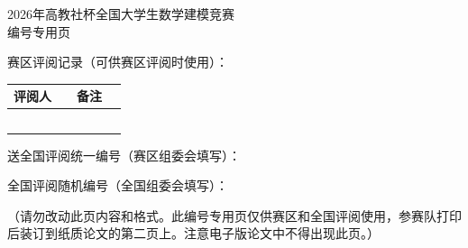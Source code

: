 \thispagestyle{empty}
\begin{center}
  {\heiti 2026年高教社杯全国大学生数学建模竞赛}\\[6pt]
  {\heiti 编\quad 号\quad 专\quad 用\quad 页}
\end{center}

\vspace{2em}
{\heiti 赛区评阅记录（可供赛区评阅时使用）：}

\vspace{1em}
\renewcommand{\arraystretch}{1.8}
\begin{center}
\begin{tabular}{|p{2.2cm}|p{4.5cm}|p{2.2cm}|p{5.5cm}|}
  \hline
  评阅人 &  & 备注 & \\
  \hline
  &  &  & \\
  \hline
  &  &  & \\
  \hline
  &  &  & \\
  \hline
  &  &  & \\
  \hline
  &  &  & \\
  \hline
\end{tabular}
\end{center}

\vspace{2em}
送全国评阅统一编号（赛区组委会填写）：\underline{\makebox[8em]{}}\par
\vspace{1.5em}
全国评阅随机编号（全国组委会填写）：\underline{\makebox[8em]{}}\par

\vspace{2.5em}
{
（请勿改动此页内容和格式。此编号专用页仅供赛区和全国评阅使用，参赛队打印后装订到纸质论文的第二页上。注意电子版论文中不得出现此页。）}

\clearpage
